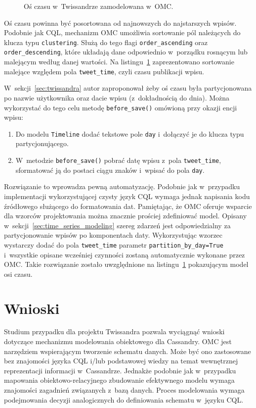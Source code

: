 \begin{figure}[ht!]
	\centering
	\theverbbox
	\caption{Oś czasu w~Twissandrze zamodelowana w~OMC.}
	\label{vrb:omc_twissandra_timeline}
\end{figure}

Oś czasu powinna być posortowana od najnowszych do najstarszych wpisów. Podobnie jak CQL, mechanizm OMC umożliwia sortowanie pól należących do klucza typu \verb+clustering+. Służą do tego flagi \verb+order_ascending+ oraz \verb+order_descending+, które układają dane odpowiednio w~porządku rosnącym lub malejącym według danej wartości. Na listingu~\ref{vrb:omc_twissandra_timeline} zaprezentowano sortowanie malejące względem pola \verb+tweet_time+, czyli czasu publikacji wpisu.

W~sekcji~\ref{sec:twissandra} autor zaproponował żeby oś czasu była partycjonowana po nazwie użytkownika oraz dacie wpisu (z~dokładnością do dnia). Można wykorzystać do tego celu metodę \verb+before_save()+ omówioną przy okazji encji wpisu:

\begin{enumerate}
	\item Do modelu \verb+Timeline+ dodać tekstowe pole \verb+day+ i~dołączyć je do klucza typu partycjonującego.
	\item W~metodzie \verb+before_save()+ pobrać datę wpisu z~pola \verb+tweet_time+, sformatować ją do postaci ciągu znaków i~wpisać do pola \verb+day+.
\end{enumerate}

Rozwiązanie to wprowadza pewną automatyzację. Podobnie jak w~przypadku implementacji wykorzystującej czysty język CQL wymaga jednak napisania kodu źródłowego służącego do formatowania dat. Pamiętając, że OMC oferuje wsparcie dla wzorców projektowania można znacznie prościej zdefiniować model. Opisany w~sekcji~\ref{sec:time_series_modeling} szereg zdarzeń jest odpowiedzialny za partycjonowanie wpisów po komponentach daty. Wykorzystując wzorzec wystarczy dodać do pola \verb+tweet_time+ parametr \verb+partition_by_day=True+ i~wszystkie opisane wcześniej czynności zostaną automatycznie wykonane przez OMC. Takie rozwiązanie zostało uwzględnione na listingu~\ref{vrb:omc_twissandra_timeline} pokazującym model osi czasu.

\section{Wnioski}
\label{sec:twissandra_case_study_remarks}

Studium przypadku dla projektu Twissandra pozwala wyciągnąć wnioski dotyczące mechanizmu modelowania obiektowego dla Cassandry. OMC jest narzędziem wspierającym tworzenie schematu danych. Może być ono zastosowane bez znajomości języka CQL i/lub podstawowej wiedzy na temat wewnętrznej reprezentacji informacji w~Cassandrze. Jednakże podobnie jak w~przypadku mapowania obiektowo-relacyjnego zbudowanie efektywnego modelu wymaga znajomości zagadnień związanych z~bazą danych. Proces modelowania wymaga podejmowania decyzji analogicznych do definiowania schematu w~języku CQL.

